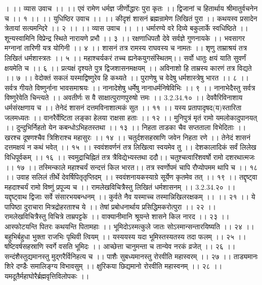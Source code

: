 । ।। व्यास उवाच ।। ।।
एवं रामेण धर्मज्ञ जीर्णोद्धारः पुरा कृतः ।।
द्विजानां च हितार्थाय श्रीमातुर्वचनेन च ।। १ ।।
।। युधिष्ठिर उवाच ।। ।।
कीदृशं शासनं ब्रह्मन्रामेण लिखितं पुरा ।।
कथयस्व प्रसादेन त्रेतायां सत्यमन्दिरे ।। २ ।।
।। व्यास उवाच ।। ।।
धर्मारण्ये वरे दिव्ये बकुलार्के स्वधिष्ठिते ।।
शून्यस्वामिनि विप्रेन्द्र स्थिते नारायणे प्रभौ ।। ३ ।।
रक्षणाधिपतौ देवे सर्वज्ञे गुणनायके ।।
भवसागर मग्नानां तारिणी यत्र योगिनी ।। ४ ।।
शासनं तत्र रामस्य राघवस्य च नामतः ।।
शृणु ताम्राश्रयं तत्र लिखितं धर्मशास्त्रतः ।। ५ ।।
महाश्चर्यकरं तच्च ह्यनेकयुगसंस्थितम्।।
सर्वो धातुः क्षयं याति सुवर्णं क्षयमेति च ।। ६ ।।
प्रत्यक्षं दृश्यते पुत्र द्विजशासनमक्षयम् ।।
अविनाशो हि ताम्रस्य कारणं तत्र विद्यते ।। ७ ।।
वेदोक्तं सकलं यस्माद्विष्णुरेव हि कथ्यते ।।
पुराणेषु च वेदेषु धर्मशास्त्रेषु भारत ।। ८ ।।
सर्वत्र गीयते विष्णुर्नाना भावसमाश्रयः ।।
नानादेशेषु धर्मेषु नानाधर्मनिषेविभिः ।। ९ ।।
नानाभेदैस्तु सर्वत्र विष्णुरेवेति चिन्त्यते ।।
अवतीर्णः स वै साक्षात्पुराणपुरुषो त्तमः ।। 3.2.34.१० ।।
देववैरिविनाशाय धर्मसंरक्षणाय च ।।
तेनेदं शासनं दत्तमविनाशात्मकं सुत ।। ११ ।।
यस्य प्रतापादृषद(य)स्तारिता जलमध्यतः ।।
वानरैर्वेष्टिता लङ्का हेलया राक्षसा हताः ।। १२ ।।
मुनिपुत्रं मृतं रामो यमलोकादुपानयत् ।।
दुन्दुभिर्निहतो येन कबन्धोऽभिहतस्तथा ।। १३ ।।
निहता ताडका चैव सप्तताला विभेदिताः ।।
खरश्च दूषणश्चैव त्रिशिराश्च महासुरः ।। १४ ।।
चतुर्दशसहस्राणि जवेन निहता रणे ।।
तेनेदं शासनं दत्तमक्षयं न कथं भवेत् ।। १५ ।।
स्ववंशवर्णनं तत्र लिखित्वा स्वयमेव तु ।।
देशकालादिकं सर्वं लिलेख विधिपूर्वकम् ।। १६ ।।
स्वमुद्राचिह्नितं तत्र त्रैविद्येभ्यस्तथा ददौ।।
चतुश्चत्वारिंशवर्षो रामो दशरथात्मजः ।। १७ ।।
तस्मिन्काले महाश्चर्यं सन्दत्तं किल भारत।।
तत्र स्वर्णोपमं चापि रौप्योपमम थापि च ।। १८ ।।
उवाह सलिलं तीर्थे देवर्षिपितृतृप्तिदम् ।।
स्ववंशनायकस्याग्रे सूर्येण कृतमेव तत् ।। १९ ।।
तद्दृष्ट्वा महदाश्चर्यं रामो विष्णुं प्रपूज्य च ।।
रामलेखविचित्रैस्तु लिखितं धर्मशासनम् ।। 3.2.34.२० ।।
यद्दृष्ट्वाथ द्विजाः सर्वे संसारभयबन्धनम् ।।
कुर्वते नैव यस्माच्च तस्मान्निखिलरक्षकम् ।। ।। २१ ।।
ये पापिष्ठा दुराचारा मित्रद्रोहरताश्च ये ।।
तेषां प्रबोधनार्थाय प्रसिद्धिमकरोत्पुरा ।। २२ ।।
रामलेखविचित्रैस्तु विचित्रे ताम्रपट्टके ।।
वाक्यानीमानि श्रूयन्ते शासने किल नारद ।। २३ ।।
आस्फोटयन्ति पितरः कथयन्ति पितामहाः ।।
भूमिदोऽस्मत्कुले जातः सोऽस्मान्सन्तारयिष्यति ।। २४ ।।
बहुभिर्बहुधा भुक्ता राजभिः पृथिवी त्वियम् ।।
यस्ययस्य यदा भूमिस्तस्यतस्य तदा फलम् ।। २५ ।।
षष्टिवर्षसहस्राणि स्वर्गे वसति भूमिदः ।।
आच्छेत्ता चानुमन्ता च तान्येव नरकं व्रजेत् ।। २६ ।।
सन्दंशैस्तुद्यमानस्तु मुद्गरैर्विनिहत्य च ।।
पाशैः सुबध्यमानस्तु रोरवीति महास्वरम् ।। २७ ।।
ताड्यमानः शिरे दण्डैः समालिङ्ग्य विभावसुम् ।।
क्षुरिकया छिद्यमानो रोरवीति महास्वनम् ।। २८ ।।
यमदूतैर्महाघोरैर्ब्रह्मवृत्तिविलोपकः ।।
